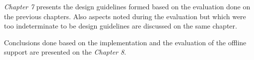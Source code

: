 \textit{Chapter 7} presents the design guidelines formed based on the evaluation done on the previous chapters. Also aspects noted during the evaluation but which were too indeterminate to be design guidelines are discussed on the same chapter.

Conclusions done based on the implementation and the evaluation of the offline support are presented on the \textit{Chapter 8}.



















